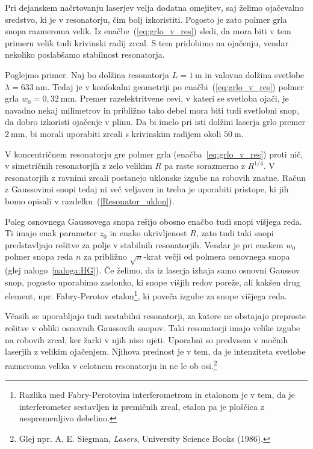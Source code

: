 Pri dejanskem načrtovanju laserjev velja dodatna omejitev, saj želimo 
ojačevalno sredstvo, ki je v resonatorju, čim bolj izkoristiti. Pogosto je zato 
polmer grla snopa razmeroma velik. Iz enačbe~(\ref{eq:grlo_v_res})
sledi, da mora biti v tem primeru velik tudi krivinski radij zrcal. S tem
pridobimo na ojačenju, vendar nekoliko poslabšamo stabilnost resonatorja.

Poglejmo primer. Naj bo dolžina resonatorja $L=1~\si{\metre}$ in valovna
dolžina svetlobe $\lambda = 633~\si{\nano\metre}$. Tedaj je v konfokalni geometriji po enačbi~(\ref{eq:grlo_v_res})
polmer grla $w_{0}=0,32~\si{\milli\metre}$. Premer razelektritvene cevi, v kateri se 
svetloba ojači, je navadno
nekaj milimetrov in približno tako debel mora biti tudi svetlobni
snop, da dobro izkoristi ojačenje v plinu.
Da bi imelo pri isti dolžini laserja grlo premer $2~\si{\milli\metre}$, bi morali
uporabiti zrcali s krivinskim radijem okoli $50~\si{\metre}$. 

V koncentričnem resonatorju gre polmer grla (enačba~\ref{eq:grlo_v_res}) proti nič, v
simetričnih resonatorjih z zelo velikim $R$ pa 
raste sorazmerno z $R^{1/4}$. V resonatorjih z ravnimi zrcali 
postanejo uklonske izgube na robovih znatne. Račun z Gaussovimi snopi tedaj ni več veljaven
in treba je uporabiti pristope, ki jih bomo opisali
v razdelku~(\ref{Resonator_uklon}).

Poleg osnovnega Gaussovega snopa rešijo obosno enačbo tudi snopi višjega reda. 
Ti imajo enak parameter $z_{0}$ in enako ukrivljenost $R$, zato tudi taki snopi 
predstavljajo rešitve za polje v stabilnih resonatorjih. Vendar je pri enakem $w_{0}$
polmer snopa reda $n$ za približno $\sqrt{n}$-krat večji od polmera osnovnega snopa
(glej nalogo~\ref{naloga:HG}). Če želimo, da iz laserja izhaja samo 
osnovni Gaussov snop, 
pogosto uporabimo zaslonko, ki snope višjih redov poreže, 
ali kakšen drug element, npr. Fabry-Perotov etalon\footnote{Razlika med Fabry-Perotovim
interferometrom in etalonom je v tem, da je interferometer sestavljen iz premičnih 
zrcal, etalon pa je ploščica z nespremenljivo debelino.}, ki poveča izgube za snope višjega reda.
\begin{remark}
Včasih se uporabljajo tudi nestabilni resonatorji, za 
katere ne obstajajo preproste rešitve v obliki osnovnih Gaussovih snopov. Taki resonatorji 
imajo velike izgube na robovih zrcal, ker žarki v njih niso ujeti. 
Uporabni so predvsem v močnih laserjih z velikim ojačenjem. Njihova prednost je v tem, da 
je intenziteta svetlobe razmeroma velika v celotnem resonatorju in ne le ob 
osi.\footnote{Glej npr. A. E. Siegman, {\it Lasers}, University Science Books (1986).}
\end{remark}

